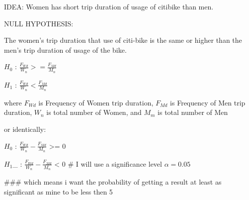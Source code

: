 IDEA:
Women has short trip duration of usage of citibike than men.

NULL HYPOTHESIS:

The women's trip duration that use of citi-bike is the same or higher than the men's trip duration of usage of the bike.

$H_0$ : $\frac{F_{Wd}}{W_{n}} >= \frac{F_{Md}}{M_{n}} $ 

$H_1$ : $\frac{F_{Wd}}{W_{n}} < \frac{F_{Md}}{M_{n}} $

where $F_{Wd}$ is Frequency of Women trip duration, $F_{Md}$ is Frequency of Men trip duration, ${W_{n}}$ is total number of Women, and ${M_{m}}$ is total number of Men

or identically:

$H_0$ : $\frac{F_{Wd}}{W_{n}} - \frac{F_{Md}}{M_{n}} $ >= 0

$H_1$_ : $\frac{F_{Wd}}{W_{n}} - \frac{F_{Md}}{M_{n}} $ < 0
# I will use a significance level  $\alpha=0.05$

### which means i want the probability of getting a result at least as significant as mine to be less then 5%